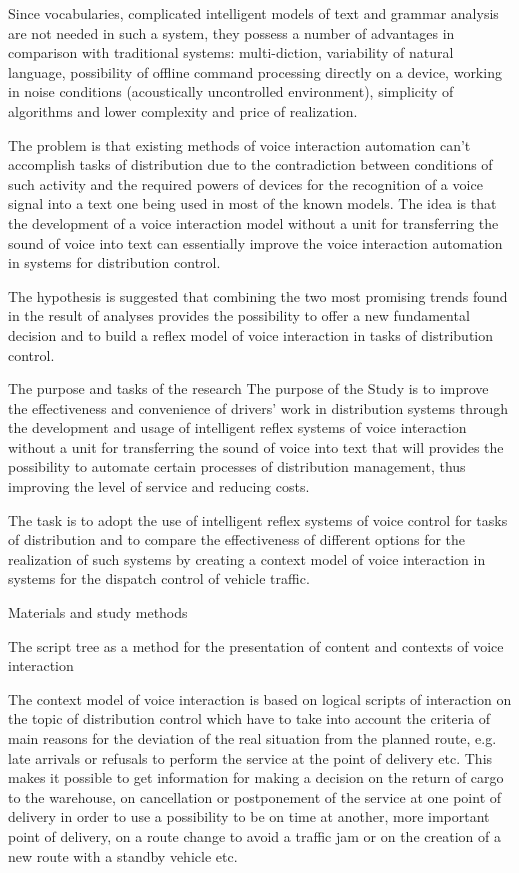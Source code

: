 Since vocabularies, complicated intelligent models of text and grammar analysis are not needed in such a system, they possess a number of advantages in comparison with traditional systems: multi-diction, variability of natural language, possibility of offline command processing directly on a device, working in noise conditions (acoustically uncontrolled environment), simplicity of algorithms and lower complexity and price of realization. 

The problem is that existing methods of voice interaction automation can’t accomplish tasks of distribution due to the contradiction between conditions of such activity and the required powers of devices for the recognition of a voice signal into a text one being used in most of the known models. The idea is that the development of a voice interaction model without a unit for transferring the sound of voice into text can essentially improve the voice interaction automation in systems for distribution control. 

The hypothesis is suggested that combining the two most promising trends found in the result of analyses provides the possibility to offer a new fundamental decision and to build a reflex model of voice interaction in tasks of distribution control. 

The purpose and tasks of the research
The purpose of the Study is to improve the effectiveness and convenience of drivers’ work in distribution systems through the development and usage of intelligent reflex systems of voice interaction without a unit for transferring the sound of voice into text that will provides the possibility to automate certain processes of distribution management, thus improving the level of service and reducing costs.

The task is to adopt the use of intelligent reflex systems of voice control for tasks of distribution and to compare the effectiveness of different options for the realization of such systems by creating a context model of voice interaction in systems for the dispatch control of vehicle traffic. 


Materials and study methods 

The script tree as a method for the presentation of content and contexts of voice interaction 

The context model of voice interaction is based on logical scripts of interaction on the topic of distribution control which have to take into account the criteria of main reasons for the deviation of the real situation from the planned route, e.g. late arrivals or refusals to perform the service at the point of delivery etc. This makes it possible to get information for making a decision on the return of cargo to the warehouse, on cancellation or postponement of the service at one point of delivery in order to use a possibility to be on time at another, more important point of delivery, on a route change to avoid a traffic jam or on the creation of a new route with a standby vehicle etc. 


